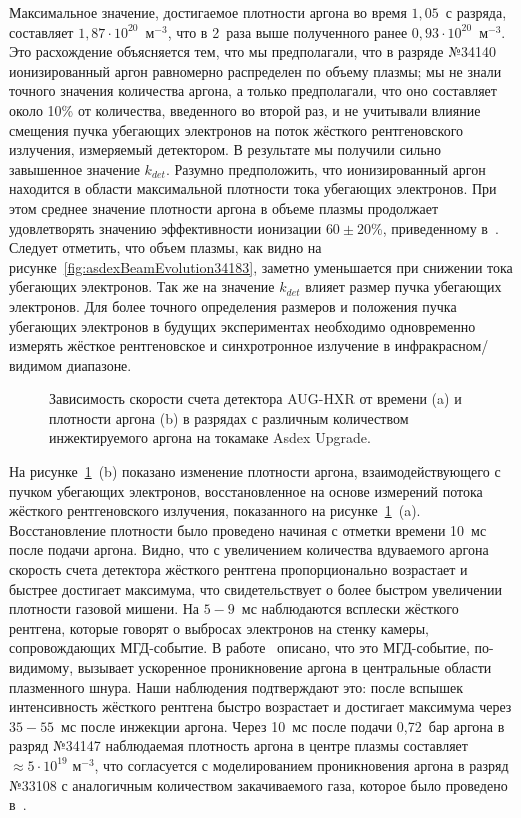 Максимальное значение, достигаемое плотности аргона во время $1,05$~с разряда, составляет $1,87 \cdot 10^{20}$~м${}^{-3}$, что в 2~раза выше полученного ранее $0,93 \cdot 10^{20}$~м${}^{-3}$. Это расхождение объясняется тем, что мы предполагали, что в разряде №34140 ионизированный аргон равномерно распределен по объему плазмы; мы не знали точного значения количества аргона, а только предполагали, что оно составляет около 10\% от количества, введенного во второй раз, и не учитывали влияние смещения пучка убегающих электронов на поток жёсткого рентгеновского излучения, измеряемый детектором. В результате мы получили сильно завышенное значение $k_{det}$. Разумно предположить, что ионизированный аргон находится в области максимальной плотности тока убегающих электронов. При этом среднее значение плотности аргона в объеме плазмы продолжает удовлетворять значению эффективности ионизации $60 \pm 20$\%, приведенному в~\cite{Pautasso2020}. Следует отметить, что объем плазмы, как видно на рисунке~\ref{fig:asdexBeamEvolution34183}, заметно уменьшается при снижении тока убегающих электронов. Так же на значение $k_{det}$ влияет размер пучка убегающих электронов. Для более точного определения размеров и положения пучка убегающих электронов в будущих экспериментах необходимо одновременно измерять жёсткое рентгеновское и синхротронное излучение в инфракрасном/видимом диапазоне.~\cite{Shevelev2021}

\begin{figure}[ht!]
  \caption{ Зависимость скорости счета детектора AUG-HXR от времени (a) и плотности аргона (b) в разрядах с различным количеством инжектируемого аргона на токамаке Asdex Upgrade.~\cite{Shevelev2021} }
  \label{fig:asdexArgonDensity34183}
\end{figure}

На рисунке~\ref{fig:asdexArgonDensity34183}~(b) показано изменение плотности аргона, взаимодействующего с пучком убегающих электронов, восстановленное на основе измерений потока жёсткого рентгеновского излучения, показанного на рисунке~\ref{fig:asdexArgonDensity34183}~(a). Восстановление плотности было проведено начиная с отметки времени  10~мс после подачи аргона. Видно, что с увеличением количества вдуваемого аргона скорость счета детектора жёсткого рентгена пропорционально возрастает и быстрее достигает максимума, что свидетельствует о более быстром увеличении плотности газовой мишени. На $5-9$~мс наблюдаются всплески жёсткого рентгена, которые говорят о выбросах электронов на стенку камеры, сопровождающих МГД-событие. В работе~\cite{Linder2020} описано, что это МГД-событие, по-видимому, вызывает ускоренное проникновение аргона в центральные области плазменного шнура. Наши наблюдения подтверждают это: после вспышек интенсивность жёсткого рентгена быстро возрастает и достигает максимума через $35-55$~мс после инжекции аргона. Через 10~мс после подачи 0,72~бар аргона в разряд №34147 наблюдаемая плотность аргона в центре плазмы составляет $\approx 5 \cdot 10^{19}$ м${}^{-3}$, что согласуется с моделированием проникновения аргона в разряд №33108 с аналогичным количеством закачиваемого газа, которое было проведено в~\cite{Linder2020}.

